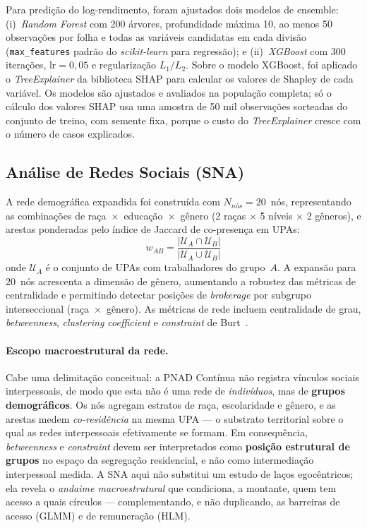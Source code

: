 \documentclass[12pt, a4paper, oneside]{article}
\begin{document}
Para predição do log-rendimento, foram ajustados dois modelos de ensemble:
(i)~\textit{Random Forest} \cite{breiman2001} com 200 árvores, profundidade
máxima 10, ao menos 50 observações por folha e todas as variáveis candidatas em cada
divisão (\texttt{max\_features} padrão do \textit{scikit-learn} para regressão); e (ii)~\textit{XGBoost} \cite{chen2016} com 300 iterações,
$\text{lr}=0{,}05$ e regularização $L_1/L_2$. Sobre o modelo XGBoost,
foi aplicado o \textit{TreeExplainer} da biblioteca SHAP
\cite{lundberg2017} para calcular os valores de Shapley de cada variável. Os modelos são
ajustados e avaliados na população completa; só o cálculo dos valores SHAP usa uma amostra
de 50 mil observações sorteadas do conjunto de treino, com semente fixa, porque o custo do
\textit{TreeExplainer} cresce com o número de casos explicados.

\subsection{Análise de Redes Sociais (SNA)}

A rede demográfica expandida foi construída com $N_{nós}=20$~nós,
representando as combinações de raça~$\times$~educação~$\times$~gênero
(2 raças $\times$ 5 níveis $\times$ 2 gêneros), e arestas ponderadas
pelo índice de Jaccard de co-presença em UPAs:
\begin{equation}
  w_{AB} = \frac{|\mathcal{U}_A \cap \mathcal{U}_B|}
                   {|\mathcal{U}_A \cup \mathcal{U}_B|}
  \label{eq:jaccard}
\end{equation}
onde $\mathcal{U}_A$ é o conjunto de UPAs com trabalhadores do grupo~$A$.
A expansão para 20~nós acrescenta a dimensão de gênero, aumentando a
robustez das métricas de centralidade e permitindo detectar posições de
\textit{brokerage} por subgrupo interseccional (raça~$\times$~gênero).
As métricas de rede incluem centralidade de grau, \textit{betweenness},
\textit{clustering coefficient} e \textit{constraint} de Burt~\cite{burt2004}.

\paragraph{Escopo macroestrutural da rede.}
Cabe uma delimitação conceitual: a PNAD Contínua não registra vínculos sociais
interpessoais, de modo que esta não é uma rede de \textit{indivíduos}, mas de
\textbf{grupos demográficos}. Os nós agregam estratos de raça, escolaridade e
gênero, e as arestas medem \textit{co-residência} na mesma UPA --- o substrato
territorial sobre o qual as redes interpessoais efetivamente se formam. Em
consequência, \textit{betweenness} e \textit{constraint} devem ser
interpretados como \textbf{posição estrutural de grupos} no espaço da
segregação residencial, e não como intermediação interpessoal medida. A SNA aqui
não substitui um estudo de laços egocêntricos; ela revela o \textit{andaime
macroestrutural} que condiciona, a montante, quem tem acesso a quais círculos
--- complementando, e não duplicando, as barreiras de acesso (GLMM) e de
remuneração (HLM).
\end{document}
